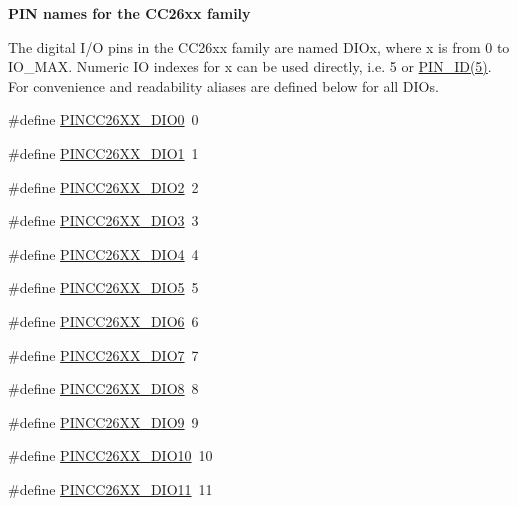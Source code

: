 \begin{Indent}{\bf P\-I\-N names for the C\-C26xx family}\par
{\em \label{_p_i_n_c_c26_x_x_8h_PINCC26XX_IONAMES}%
\hypertarget{_p_i_n_c_c26_x_x_8h_PINCC26XX_IONAMES}{}%


The digital I/\-O pins in the C\-C26xx family are named D\-I\-Ox, where x is from 0 to I\-O\-\_\-\-M\-A\-X. Numeric I\-O indexes for x can be used directly, i.\-e. 5 or \hyperlink{_p_i_n_8h_add47c82f7563d28053f76d368d344bc6}{P\-I\-N\-\_\-\-I\-D(5)}. For convenience and readability aliases are defined below for all D\-I\-Os. }\begin{DoxyCompactItemize}
\item 
\#define \hyperlink{_p_i_n_c_c26_x_x_8h_a34a392179279242211f40dc5e70a727f}{P\-I\-N\-C\-C26\-X\-X\-\_\-\-D\-I\-O0}~0
\item 
\#define \hyperlink{_p_i_n_c_c26_x_x_8h_a8c89bec12551b6168fa495a624e5e311}{P\-I\-N\-C\-C26\-X\-X\-\_\-\-D\-I\-O1}~1
\item 
\#define \hyperlink{_p_i_n_c_c26_x_x_8h_adce988906439086ebb744865f66cbbde}{P\-I\-N\-C\-C26\-X\-X\-\_\-\-D\-I\-O2}~2
\item 
\#define \hyperlink{_p_i_n_c_c26_x_x_8h_a25a6de3a42448c978e4426d45d53ffd9}{P\-I\-N\-C\-C26\-X\-X\-\_\-\-D\-I\-O3}~3
\item 
\#define \hyperlink{_p_i_n_c_c26_x_x_8h_a01b67a23d7f4b003e280d5b45dfe26e2}{P\-I\-N\-C\-C26\-X\-X\-\_\-\-D\-I\-O4}~4
\item 
\#define \hyperlink{_p_i_n_c_c26_x_x_8h_a954b1bfc19345d5df0011ec2d8a21c36}{P\-I\-N\-C\-C26\-X\-X\-\_\-\-D\-I\-O5}~5
\item 
\#define \hyperlink{_p_i_n_c_c26_x_x_8h_a0087796716ceb72a56adef9c4c2a5481}{P\-I\-N\-C\-C26\-X\-X\-\_\-\-D\-I\-O6}~6
\item 
\#define \hyperlink{_p_i_n_c_c26_x_x_8h_af646857e4e4b7bc34ccf0b6029071a4d}{P\-I\-N\-C\-C26\-X\-X\-\_\-\-D\-I\-O7}~7
\item 
\#define \hyperlink{_p_i_n_c_c26_x_x_8h_a2ea0010cfa2ff03ce27ff41ba113dfe3}{P\-I\-N\-C\-C26\-X\-X\-\_\-\-D\-I\-O8}~8
\item 
\#define \hyperlink{_p_i_n_c_c26_x_x_8h_aa21c44a220737e668b5f47d53948c91e}{P\-I\-N\-C\-C26\-X\-X\-\_\-\-D\-I\-O9}~9
\item 
\#define \hyperlink{_p_i_n_c_c26_x_x_8h_af2b5edf7bd5e09692bd588db69762718}{P\-I\-N\-C\-C26\-X\-X\-\_\-\-D\-I\-O10}~10
\item 
\#define \hyperlink{_p_i_n_c_c26_x_x_8h_a47dec0c44e437a1ee762a5ad65579711}{P\-I\-N\-C\-C26\-X\-X\-\_\-\-D\-I\-O11}~11

\end{DoxyCompactItemize}
\end{Indent}
